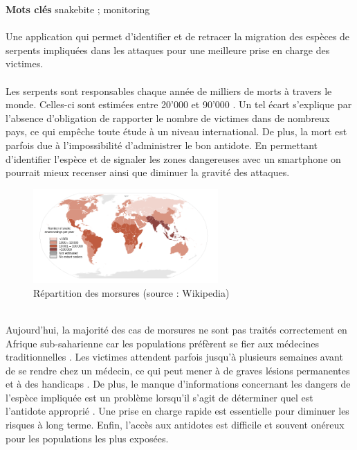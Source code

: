 \documentclass[10pt, conference, compsocconf]{llncs}
\begin{document}
\textbf{Mots clés}
snakebite ; monitoring \\
\\
Une application qui permet d'identifier et de retracer la migration des espèces de serpents impliquées dans les attaques pour une meilleure prise en charge des victimes. \\
\\
Les serpents sont responsables chaque année de milliers de morts à travers le monde. Celles-ci sont estimées entre 20'000 et 90'000 \cite{kasturiratne_global_2008}. Un tel écart s'explique par l'absence d'obligation de rapporter le nombre de victimes dans de nombreux pays, ce qui empêche toute étude à un niveau international. De plus, la mort est parfois due à l'impossibilité d'administrer le bon antidote. En permettant d'identifier l'espèce et de signaler les zones dangereuses avec un smartphone on pourrait mieux recenser ainsi que diminuer la gravité des attaques. \\
\begin{figure}
	\begin{center}
		\includegraphics[width=200pt]{snake.png}
	\end{center}
	\caption{Répartition des morsures (source : Wikipedia)}
\end{figure}
\\
Aujourd'hui, la majorité des cas de morsures ne sont pas traités correctement en Afrique sub-saharienne car les populations préfèrent se fier aux médecines traditionnelles \cite{noauthor_epidemiology_2017}. Les victimes attendent parfois jusqu'à plusieurs semaines avant de se rendre chez un médecin, ce qui peut mener à de graves lésions permanentes et à des handicaps \cite{chippaux_snake-bites:_2009}. De plus, le manque d'informations concernant les dangers de l'espèce impliquée est un problème lorsqu'il s'agit de déterminer quel est l'antidote approprié \cite{gutierrez_trends_2007}. Une prise en charge rapide est essentielle pour diminuer les risques à long terme. Enfin, l'accès aux antidotes est difficile et souvent onéreux pour les populations les plus exposées. \\
\\
\end{document}
